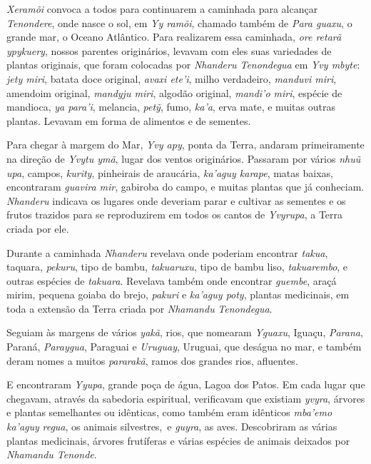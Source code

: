  


 

\emph{Xeramõi} convoca a todos para continuarem a caminhada para
alcançar \emph{Tenondere}, onde nasce o sol, em \emph{Yy ramõi}, chamado
também de \emph{Para guaxu}, o grande mar, o Oceano Atlântico. Para
realizarem essa caminhada, \emph{ore retarã ypykuery}, nossos parentes
originários, levavam com eles suas variedades de plantas originais, que
foram colocadas por \emph{Nhanderu Tenondegua} em \emph{Yvy mbyte}:
\emph{jety miri}, batata doce original, \emph{avaxi ete'i}, milho
verdadeiro, \emph{manduvi miri}, amendoim original, \emph{mandyju
miri}, algodão original, \emph{mandi'o miri}, espécie de mandioca,
\emph{ya para'i}, melancia, \emph{petỹ}, fumo, \emph{ka'a}, erva mate, e
muitas outras plantas. Levavam em forma de alimentos e de sementes.

Para chegar à margem do Mar, \emph{Yvy apy}, ponta da Terra, andaram
primeiramente na direção de \emph{Yvytu ymã}, lugar dos ventos
originários. Passaram por vários \emph{nhuũ upa}, campos, \emph{kurity},
pinheirais de araucária, \emph{ka'aguy karape}, matas baixas,
encontraram \emph{guavira mir}, gabiroba do campo, e muitas plantas que
já conheciam. \emph{Nhanderu} indicava os lugares onde deveriam parar e
cultivar as sementes e os frutos trazidos para se reproduzirem em todos
os cantos de \emph{Yvyrupa}, a Terra criada por ele.

Durante a caminhada \emph{Nhanderu} revelava onde poderiam encontrar
\emph{takua}, taquara, \emph{pekuru}, tipo de bambu, \emph{takuaruxu},
tipo de bambu liso, \emph{takuarembo}, e outras espécies de
\emph{takuara}. Revelava também onde encontrar \emph{guembe}, araçá
mirim, pequena goiaba do brejo, \emph{pakuri} e \emph{ka'aguy poty},
plantas medicinais, em toda a extensão da Terra criada por
\emph{Nhamandu} \emph{Tenondegua}.


 

Seguiam às margens de vários \emph{yakã}, rios, que nomearam
\emph{Yguaxu}, Iguaçu, \emph{Parana}, Paraná, \emph{Paraygua}, Paraguai
e \emph{Uruguay}, Uruguai, que deságua no mar, e também deram nomes a
muitos \emph{pararakã}, ramos dos grandes rios, afluentes.

E encontraram \emph{Yyupa}, grande poça de água, Lagoa dos Patos. Em
cada lugar que chegavam, através da sabedoria espiritual, verificavam
que existiam \emph{yvyra}, árvores e plantas semelhantes ou idênticas,
como também eram idênticos \emph{mba'emo ka'aguy} \emph{regua}, os
animais silvestres,{}~e \emph{guyra}, as aves. Descobriram as
várias plantas medicinais, árvores frutíferas e várias espécies de
animais deixados por \emph{Nhamandu Tenonde}.


